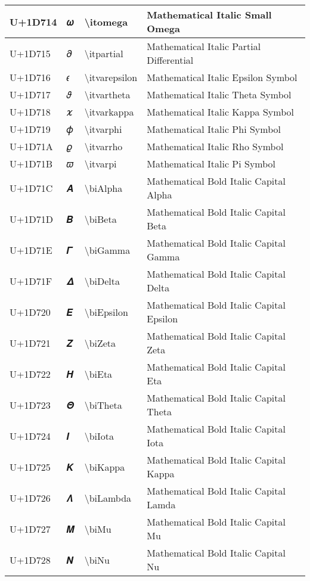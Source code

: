 \begin{table}[h]
\begin{tabulary}{\linewidth}{|L|L|L|L|}
\hline
U+1D714 & 𝜔 & {\textbackslash}itomega & Mathematical Italic Small Omega \\
\hline
U+1D715 & 𝜕 & {\textbackslash}itpartial & Mathematical Italic Partial Differential \\
\hline
U+1D716 & 𝜖 & {\textbackslash}itvarepsilon & Mathematical Italic Epsilon Symbol \\
\hline
U+1D717 & 𝜗 & {\textbackslash}itvartheta & Mathematical Italic Theta Symbol \\
\hline
U+1D718 & 𝜘 & {\textbackslash}itvarkappa & Mathematical Italic Kappa Symbol \\
\hline
U+1D719 & 𝜙 & {\textbackslash}itvarphi & Mathematical Italic Phi Symbol \\
\hline
U+1D71A & 𝜚 & {\textbackslash}itvarrho & Mathematical Italic Rho Symbol \\
\hline
U+1D71B & 𝜛 & {\textbackslash}itvarpi & Mathematical Italic Pi Symbol \\
\hline
U+1D71C & 𝜜 & {\textbackslash}biAlpha & Mathematical Bold Italic Capital Alpha \\
\hline
U+1D71D & 𝜝 & {\textbackslash}biBeta & Mathematical Bold Italic Capital Beta \\
\hline
U+1D71E & 𝜞 & {\textbackslash}biGamma & Mathematical Bold Italic Capital Gamma \\
\hline
U+1D71F & 𝜟 & {\textbackslash}biDelta & Mathematical Bold Italic Capital Delta \\
\hline
U+1D720 & 𝜠 & {\textbackslash}biEpsilon & Mathematical Bold Italic Capital Epsilon \\
\hline
U+1D721 & 𝜡 & {\textbackslash}biZeta & Mathematical Bold Italic Capital Zeta \\
\hline
U+1D722 & 𝜢 & {\textbackslash}biEta & Mathematical Bold Italic Capital Eta \\
\hline
U+1D723 & 𝜣 & {\textbackslash}biTheta & Mathematical Bold Italic Capital Theta \\
\hline
U+1D724 & 𝜤 & {\textbackslash}biIota & Mathematical Bold Italic Capital Iota \\
\hline
U+1D725 & 𝜥 & {\textbackslash}biKappa & Mathematical Bold Italic Capital Kappa \\
\hline
U+1D726 & 𝜦 & {\textbackslash}biLambda & Mathematical Bold Italic Capital Lamda \\
\hline
U+1D727 & 𝜧 & {\textbackslash}biMu & Mathematical Bold Italic Capital Mu \\
\hline
U+1D728 & 𝜨 & {\textbackslash}biNu & Mathematical Bold Italic Capital Nu \\

\end{tabulary}
\end{table}
